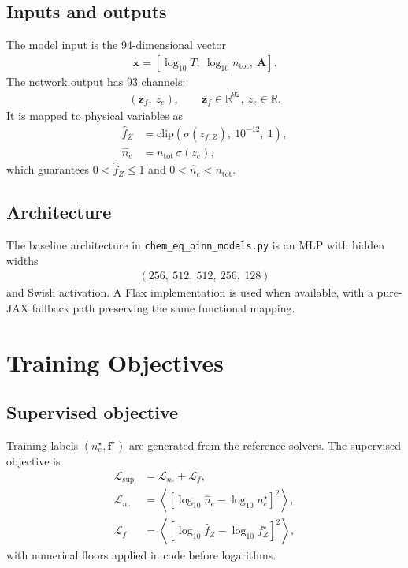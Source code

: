 \documentclass[11pt]{article}
\begin{document}
\subsection{Inputs and outputs}
The model input is the 94-dimensional vector
\begin{align}
    \bm{x} = \left[\log_{10}T,\ \log_{10}n_{\mathrm{tot}},\ \bm{A}\right].
\end{align}
The network output has 93 channels:
\begin{align}
    (\bm{z}_f,\ z_e), \qquad \bm{z}_f\in\mathbb{R}^{92},\ z_e\in\mathbb{R}.
\end{align}
It is mapped to physical variables as
\begin{align}
    \hat{f}_Z &= \mathrm{clip}\!\left(\sigma(z_{f,Z}),\ 10^{-12},\ 1\right), \\
    \hat{n}_e &= n_{\mathrm{tot}}\,\sigma(z_e),
\end{align}
which guarantees $0<\hat{f}_Z\le 1$ and $0<\hat{n}_e<n_{\mathrm{tot}}$.

\subsection{Architecture}
The baseline architecture in \texttt{chem\_eq\_pinn\_models.py} is an MLP with hidden widths
\begin{align}
    (256,\ 512,\ 512,\ 256,\ 128)
\end{align}
and Swish activation. A Flax implementation is used when available, with a pure-JAX fallback path preserving the same functional mapping.

\section{Training Objectives}
\subsection{Supervised objective}
Training labels $(n_e^\star,\bm{f}^\star)$ are generated from the reference solvers. The supervised objective is
\begin{align}
    \mathcal{L}_{\mathrm{sup}}
    &= \mathcal{L}_{n_e} + \mathcal{L}_f, \\
    \mathcal{L}_{n_e}
    &= \left\langle \left[\log_{10}\hat{n}_e - \log_{10}n_e^\star\right]^2 \right\rangle, \\
    \mathcal{L}_f
    &= \left\langle \left[\log_{10}\hat{f}_Z - \log_{10}f_Z^\star\right]^2 \right\rangle,
\end{align}
with numerical floors applied in code before logarithms.
\end{document}
